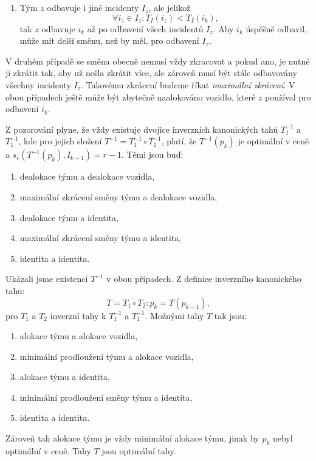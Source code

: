 \begin{dukaz}
\begin{enumerate}
    \item
      Tým $z$ odbavuje i jiné incidenty $I_z$, ale jelikož
      \begin{equation*}
        \forall i_z \in I_z \colon T_I(i_z) < T_I(i_k),
      \end{equation*}
      tak $z$ odbavuje $i_k$ až po odbavení všech incidentů $I_z$.
      Aby $i_k$ úspěšně odbavil, může mít delší směnu, než by měl, pro odbavení $I_z$.
  \end{enumerate}

  V druhém případě se směna obecně nemusí vždy zkracovat a pokud ano, je nutné ji zkrátit tak, aby už nešla zkrátit více,
  ale zároveň musí být stále odbavovány všechny incidenty $I_z$.
  Takovému zkrácení budeme říkat \textit{maximální zkrácení}.
  V obou případech ještě může být zbytečně naalokováno vozidlo, které $z$ používal pro odbavení $i_k$.

  Z pozorování plyne, že vždy existuje dvojice inverzních kanonických tahů $T_1^{-1}$ a $T_1^{-1}$, kde pro jejich složení $T^{-1} = T_1^{-1} \circ T_1^{-1}$,
  platí, že $T^{-1}(p_k)$ je optimální v ceně a $s_c(T^{-1}(p_k), I_{k-1}) = r - 1$.
  Těmi jsou buď:
  \begin{enumerate}
  \item
    dealokace týmu a dealokace vozidla, 
  \item
    maximální zkrácení směny týmu a dealokace vozidla,
  \item
    dealokace týmu a identita,
  \item
    maximální zkrácení směny týmu a identita,
  \item
    identita a identita.
  \end{enumerate}
  Ukázali jsme existenci $T^{-1}$ v obou případech. Z definice inverzního kanonického tahu:
  \begin{equation*}
    T = T_1 \circ T_2 \colon p_k = T(p_{k-1}), 
  \end{equation*}
  pro $T_1$ a $T_2$ inverzní tahy k $T_1^{-1}$ a $T_1^{-1}$.
  Možnými tahy $T$ tak jsou:
  \begin{enumerate}
  \item
    alokace týmu a alokace vozidla, 
  \item
    minimální prodloužení týmu a alokace vozidla,
  \item
    alokace týmu a identita,
  \item
    minimální prodloužení směny týmu a identita,
  \item
    identita a identita.
  \end{enumerate}

  Zároveň tah alokace týmu je vždy minimální alokace týmu, jinak by $p_k$ nebyl optimální v ceně.
  Tahy $T$ jsou optimální tahy.
\end{dukaz}

